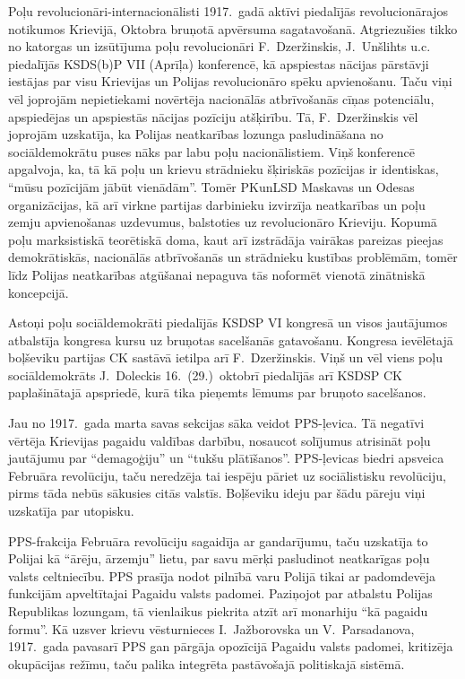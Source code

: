 \documentclass[twoside,a5paper,12pt,fleqn,openany]{extbook}
\begin{document}
Poļu revolucionāri-internacionālisti 1917.~gadā aktīvi piedalījās revolucionārajos notikumos Krievijā, Oktobra bruņotā apvērsuma sagatavošanā. Atgriezušies tikko no katorgas un izsūtījuma poļu revolucionāri F.~Dzeržinskis, J.~Unšlihts u.c. piedalījās KSDS(b)P VII (Aprīļa) konferencē, kā apspiestas nācijas pārstāvji iestājas par visu Krievijas un Polijas revolucionāro spēku apvienošanu. Taču viņi vēl joprojām nepietiekami novērtēja nacionālās atbrīvošanās cīņas potenciālu, apspiedējas un apspiestās nācijas pozīciju atšķirību. Tā, F.~Dzeržinskis vēl joprojām uzskatīja, ka Polijas neatkarības lozunga pasludināšana no sociāldemokrātu puses nāks par labu poļu nacionālistiem. Viņš konferencē apgalvoja, ka, tā kā poļu un krievu strādnieku šķiriskās pozīcijas ir identiskas, ``mūsu pozīcijām jābūt vienādām''. Tomēr PKunLSD Maskavas un Odesas organizācijas, kā arī virkne partijas darbinieku izvirzīja neatkarības un poļu zemju apvienošanas uzdevumus, balstoties uz revolucionāro Krieviju. Kopumā poļu marksistiskā teorētiskā doma, kaut arī izstrādāja vairākas pareizas pieejas demokrātiskās, nacionālās atbrīvošanās un strādnieku kustības problēmām, tomēr līdz Polijas neatkarības atgūšanai nepaguva tās noformēt vienotā zinātniskā koncepcijā.

Astoņi poļu sociāldemokrāti piedalījās KSDSP VI kongresā un visos jautājumos atbalstīja kongresa kursu uz bruņotas sacelšanās gatavošanu. Kongresa ievēlētajā boļševiku partijas CK sastāvā ietilpa arī F.~Dzeržinskis. Viņš un vēl viens poļu sociāldemokrāts J.~Doleckis 16.~(29.)~oktobrī piedalījās arī KSDSP CK paplašinātajā apspriedē, kurā tika pieņemts lēmums par bruņoto sacelšanos.

Jau no 1917.~gada marta savas sekcijas sāka veidot PPS-ļevica. Tā negatīvi vērtēja Krievijas pagaidu valdības darbību, nosaucot solījumus atrisināt poļu jautājumu par ``demagoģiju'' un ``tukšu plātīšanos''. PPS-ļevicas biedri apsveica Februāra revolūciju, taču neredzēja tai iespēju pāriet uz sociālistisku revolūciju, pirms tāda nebūs sākusies citās valstīs. Boļševiku ideju par šādu pāreju viņi uzskatīja par utopisku.

PPS-frakcija Februāra revolūciju sagaidīja ar gandarījumu, taču uzskatīja to Polijai kā ``ārēju, ārzemju'' lietu, par savu mērķi pasludinot neatkarīgas poļu valsts celtniecību. PPS prasīja nodot pilnībā varu Polijā tikai ar padomdevēja funkcijām apveltītajai Pagaidu valsts padomei. Paziņojot par atbalstu Polijas Republikas lozungam, tā vienlaikus piekrita atzīt arī monarhiju ``kā pagaidu formu''. Kā uzsver krievu vēsturnieces I.~Jažborovska un V.~Parsadanova, 1917.~gada pavasarī PPS gan pārgāja opozīcijā Pagaidu valsts padomei, kritizēja okupācijas režīmu, taču palika integrēta pastāvošajā politiskajā sistēmā.
\end{document}
